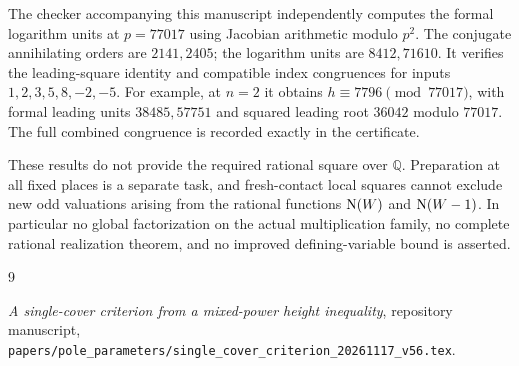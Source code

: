\documentclass[11pt,a4paper]{article}
\newcommand{\Q}{\mathbb Q}\newcommand{\Z}{\mathbb Z}
\begin{document}
The checker accompanying this manuscript independently computes
the formal logarithm units at $p=77017$ using Jacobian arithmetic
modulo $p^2$. The conjugate annihilating orders are $2141,2405$;
the logarithm units are $8412,71610$. It verifies the leading-square
identity and compatible index congruences for inputs
$1,2,3,5,8,-2,-5$. For example, at $n=2$ it obtains
$h\equiv7796\pmod {77017}$, with formal leading units
$38485,57751$ and squared leading root $36042$ modulo $77017$.
The full combined congruence is recorded exactly in the certificate.

These results do not provide the required rational square over
$\Q$. Preparation at all fixed places is a separate task, and
fresh-contact local squares cannot exclude new odd valuations
arising from the rational functions $\operatorname{N}(W)$ and $\operatorname{N}(W-1)$.
In particular no global factorization on the actual multiplication
family, no complete rational realization theorem, and no improved
defining-variable bound is asserted.

\begin{thebibliography}{9}\raggedright
{}\emph{A single-cover criterion from a mixed-power height
inequality}, repository manuscript,
\nolinkurl{papers/pole_parameters/single_cover_criterion_20261117_v56.tex}.
\end{thebibliography}
\end{document}
